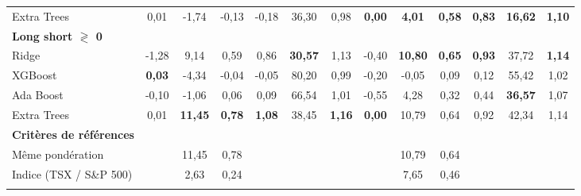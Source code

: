 \begin{table}[h]
{\begin{tabular}{l *{6}{S[table-format=3.2]} | *{6}{S[table-format=3.2]}}
Extra Trees & 0,01 & -1,74 & -0,13 & -0,18 & 36,30 & 0,98 & \bfseries\color{Green}0,00 & \bfseries\color{Green}4,01 & \bfseries\color{Green}0,58 & \bfseries\color{Green}0,83 & \bfseries\color{Green}16,62 & \bfseries\color{Green}1,10 \\ \addlinespace[0.1cm]
\textbf{Long short $\gtrless$ 0} &  &  &  &  &  &  &  &  &  &  &  & \\
\addlinespace[0.1cm]
Ridge & -1,28 & 9,14 & 0,59 & 0,86 & \bfseries\color{Green}30,57 & 1,13 & -0,40 & \bfseries\color{Green}10,80 & \bfseries\color{Green}0,65 & \bfseries\color{Green}0,93 & 37,72 & \bfseries\color{Green}1,14 \\ \addlinespace[0.1cm]
XGBoost & \bfseries\color{Green}0,03 & -4,34 & -0,04 & -0,05 & 80,20 & 0,99 & -0,20 & -0,05 & 0,09 & 0,12 & 55,42 & 1,02 \\ \addlinespace[0.1cm]
Ada Boost & -0,10 & -1,06 & 0,06 & 0,09 & 66,54 & 1,01 & -0,55 & 4,28 & 0,32 & 0,44 & \bfseries\color{Green}36,57 & 1,07 \\ \addlinespace[0.1cm]
Extra Trees & 0,01 & \bfseries\color{Green}11,45 & \bfseries\color{Green}0,78 & \bfseries\color{Green}1,08 & 38,45 & \bfseries\color{Green}1,16 & \bfseries\color{Green}0,00 & 10,79 & 0,64 & 0,92 & 42,34 & 1,14 \\ \addlinespace[0.1cm]
\textbf{Critères de références} &  &  &  &  &  &  &  &  &  &  &  & \\
\addlinespace[0.1cm]
Même pondération &  & 11,45 & 0,78 &  &  &  &  & 10,79 & 0,64 &  &  &  \\ \addlinespace[0.1cm]
Indice (TSX / S\&P 500) &  & 2,63 & 0,24 &  &  &  &  & 7,65 & 0,46 &  &  &  \\ \addlinespace[0.1cm]
\bottomrule
\end{tabular}}
\end{table}
